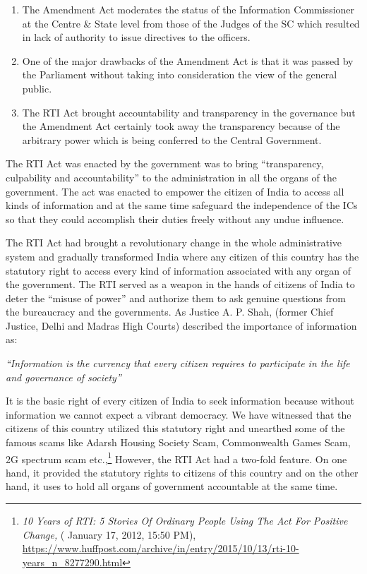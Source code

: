 \begin{multicols}{2}
\begin{enumerate}
\item The Amendment Act moderates the status of the Information Commissioner at the
Centre \& State level from those of the Judges of the SC which resulted in lack of
authority to issue directives to the officers.

\item One of the major drawbacks of the Amendment Act is that it was passed by the
Parliament without taking into consideration the view of the general public.

\item The RTI Act brought accountability and transparency in the governance but the
Amendment Act certainly took away the transparency because of the arbitrary power
which is being conferred to the Central Government.
\end{enumerate}


\noi
The RTI Act was enacted by the government was to bring “transparency, culpability and
accountability” to the administration in all the organs of the government. The act was enacted
to empower the citizen of India to access all kinds of information and at the same time
safeguard the independence of the ICs so that they could accomplish their duties freely
without any undue influence.

\noi
The RTI Act had brought a revolutionary change in the whole administrative system and
gradually transformed India where any citizen of this country has the statutory right to access
every kind of information associated with any organ of the government. The RTI served as a
weapon in the hands of citizens of India to deter the “misuse of power” and authorize them to
ask genuine questions from the bureaucracy and the governments. As Justice A. P. Shah,
(former Chief Justice, Delhi and Madras High Courts) described the importance of
information as:

\noi
\begin{quoting}
\textit{“Information is the currency that every citizen requires to participate in the life and
governance of society”}
\end{quoting}

\noi
It is the basic right of every citizen of India to seek information because without information
we cannot expect a vibrant democracy. We have witnessed that the citizens of this country
utilized this statutory right and unearthed some of the famous scams like Adarsh Housing
Society Scam, Commonwealth Games Scam, 2G spectrum scam etc.,\footnote{\textit{10 Years of RTI: 5 Stories Of Ordinary People Using The Act For Positive Change,} ( January 17, 2012, 15:50
PM), \url{https://www.huffpost.com/archive/in/entry/2015/10/13/rti-10-years_n_8277290.html}} However, the RTI Act
had a two-fold feature. On one hand, it provided the statutory rights to citizens of this country
and on the other hand, it uses to hold all organs of government accountable at the same time. 


\end{multicols}
